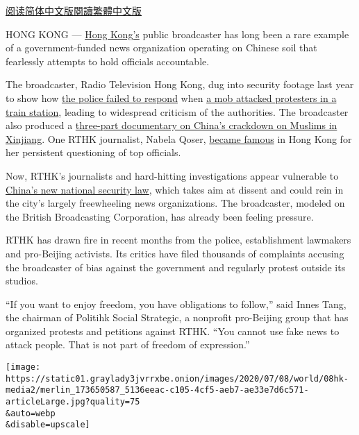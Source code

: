 \href{https://cn.nytimes3xbfgragh.onion/china/20200709/hong-kong-security-china-media/}{阅读简体中文版}\href{https://cn.nytimes3xbfgragh.onion/china/20200709/hong-kong-security-china-media/zh-hant/}{閱讀繁體中文版}

HONG KONG ---
\href{https://www.nytimes3xbfgragh.onion/2020/07/13/world/asia/hong-kong-elections-security.html}{Hong
Kong's} public broadcaster has long been a rare example of a
government-funded news organization operating on Chinese soil that
fearlessly attempts to hold officials accountable.

The broadcaster, Radio Television Hong Kong, dug into security footage
last year to show how
\href{https://tvfilm.newyorkfestivals.com/Winners/WinnerDetailsNew/ae1a0cfa-80bf-4449-bddf-47ddee103758}{the
police failed to respond} when
\href{https://www.nytimes3xbfgragh.onion/2019/07/22/world/asia/hong-kong-protest-mob-attack-yuen-long.html}{a
mob attacked protesters in a train station}, leading to widespread
criticism of the authorities. The broadcaster also produced a
\href{https://tvfilm.newyorkfestivals.com/Winners/WinnerDetailsNew/e8b03ef2-7a8a-422f-b42c-cc44f802f7f6}{three-part
documentary on China's crackdown on Muslims in Xinjiang}. One RTHK
journalist, Nabela Qoser,
\href{https://twitter.com/tomgrundy/status/1153515102043197442}{became
famous} in Hong Kong for her persistent questioning of top officials.

Now, RTHK's journalists and hard-hitting investigations appear
vulnerable to
\href{https://www.nytimes3xbfgragh.onion/2020/07/13/world/asia/hong-kong-elections-security.html}{China's
new national security law}, which takes aim at dissent and could rein in
the city's largely freewheeling news organizations. The broadcaster,
modeled on the British Broadcasting Corporation, has already been
feeling pressure.

RTHK has drawn fire in recent months from the police, establishment
lawmakers and pro-Beijing activists. Its critics have filed thousands of
complaints accusing the broadcaster of bias against the government and
regularly protest outside its studios.

``If you want to enjoy freedom, you have obligations to follow,'' said
Innes Tang, the chairman of Politihk Social Strategic, a nonprofit
pro-Beijing group that has organized protests and petitions against
RTHK. ``You cannot use fake news to attack people. That is not part of
freedom of expression.''

\texttt{[image: https://static01.graylady3jvrrxbe.onion/images/2020/07/08/world/08hk-media2/merlin\_173650587\_5136eeac-c105-4cf5-aeb7-ae33e7d6c571-articleLarge.jpg?quality=75\\\&auto=webp\\\&disable=upscale]}

